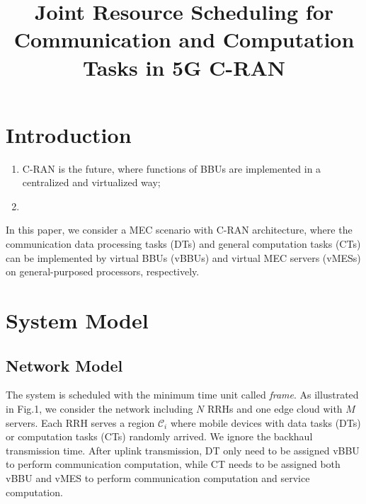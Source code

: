 \documentclass[12pt, draftclsnofoot, onecolumn]{IEEEtran}
\newcommand{\deny}[1]{}
\begin{document}
	
	\title{
		Joint Resource Scheduling for \deny{Heterogeneous} Communication and Computation Tasks in 5G C-RAN
	}
	\author{
    }%
	\maketitle

\section{Introduction}
	\begin{enumerate}
		\item C-RAN is the future, where functions of BBUs are implemented in a centralized and virtualized way;
		\item 
	\end{enumerate}

	In this paper, we consider a MEC scenario with C-RAN architecture,
	where the communication data processing tasks (DTs) and general computation tasks (CTs) can be implemented by virtual BBUs (vBBUs) and virtual MEC servers (vMESs) on general-purposed processors, respectively.

\section{System Model}
\subsection{Network Model}
The system is scheduled with the minimum time unit called \emph{frame}.
As illustrated in Fig.1, we consider the network including $N$ RRHs and one edge cloud with $M$ servers. Each RRH serves a region $\mathcal{C}_{i}$ where mobile devices with data tasks (DTs) or computation tasks (CTs) randomly arrived. We ignore the backhaul transmission time. After uplink transmission, DT only need to be assigned vBBU to perform communication computation, while CT needs to be assigned both vBBU and vMES to perform communication computation and service computation.
\end{document}
